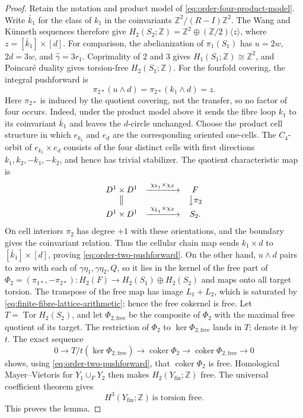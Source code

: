 \begin{proof}
Retain the notation and product model of
\eqref{eq:order-four-product-model}.
Write $\bar k_1$ for the class of $k_1$ in the coinvariants
$\mathbb Z^2/(R-I)\mathbb Z^2$.  The Wang and K\"unneth sequences
therefore give
$H_2(S_2;\mathbb Z)=\mathbb Z^2\oplus
(\mathbb Z/2)\langle z\rangle$, where
$z=[\bar k_1]\times[d]$.
For comparison, the abelianization of $\pi_1(S_1)$ has
$u=2w$, $2d=3w$, and $\widehat\gamma=3r_1$.  Coprimality of $2$ and $3$ gives
$H_1(S_1;\mathbb Z)\cong\mathbb Z^2$, and Poincar\'e duality gives
torsion-free $H_2(S_1;\mathbb Z)$.
For the fourfold covering, the integral pushforward is
\begin{equation}\label{eq:order-two-pushforward}
 \pi_{2*}(u\wedge d)
 =\pi_{2*}(k_1\wedge d)=z.
\end{equation}
Here $\pi_{2*}$ is induced by the quotient covering, not the transfer, so
no factor of four occurs.  Indeed, under the product model above it sends the
fibre loop $k_1$ to its coinvariant $\bar k_1$ and leaves the $d$-circle
unchanged.  Choose the product cell structure in which $e_{k_1}$ and
$e_d$ are the corresponding oriented one-cells.  The $C_4$-orbit of
$e_{k_1}\times e_d$ consists of the four distinct cells with first
directions $k_1,k_2,-k_1,-k_2$, and hence has trivial stabilizer.  The
quotient characteristic map is
\[
 \begin{array}{ccc}
 D^1\times D^1&
 \xrightarrow{\ \chi_{k_1}\times\chi_d\ }&F\\
 \big\Vert&&\big\downarrow{\pi_2}\\
 D^1\times D^1&
 \xrightarrow{\ \chi_{\bar k_1}\times\chi_d\ }&S_2 .
 \end{array}
\]
On cell interiors $\pi_2$ has degree $+1$ with these orientations, and
the boundary gives the coinvariant relation.  Thus the cellular chain map
sends $k_1\times d$ to $[\bar k_1]\times[d]$, proving
\eqref{eq:order-two-pushforward}.
On the other hand, $u\wedge d$ pairs to zero with each of
$\gamma\eta_1,\gamma\eta_2,Q$, so it lies in the kernel of the free part of
$\Phi_2=(\pi_{1*},-\pi_{2*}):H_2(F)\to H_2(S_1)\oplus H_2(S_2)$
and maps onto all target torsion.  The transpose of the free map has image
$L_1+L_2$, which is saturated by
\eqref{eq:finite-fibre-lattice-arithmetic}; hence the free cokernel is
free.  Let $T=\operatorname{Tor}H_2(S_2)$, and let
$\Phi_{2,\mathrm{free}}$ be the composite of $\Phi_2$ with the
maximal free quotient of its target.  The restriction of $\Phi_2$ to
$\ker\Phi_{2,\mathrm{free}}$ lands in $T$; denote it by $t$.  The
exact sequence
\[
 0\longrightarrow T/t(\ker\Phi_{2,\mathrm{free}})
 \longrightarrow\operatorname{coker}\Phi_2
 \longrightarrow\operatorname{coker}\Phi_{2,\mathrm{free}}
 \longrightarrow0
\]
shows, using \eqref{eq:order-two-pushforward}, that
$\operatorname{coker}\Phi_2$ is free.  Homological
Mayer--Vietoris for $Y_1\cup_F Y_2$ then makes
$H_2(Y_{\mathrm{fin}};\mathbb Z)$ free.  The universal coefficient theorem gives
\begin{equation}\label{eq:H3-B-torsion-free}
 H^3(Y_{\mathrm{fin}};\mathbb Z)\ \text{is torsion free}.
\end{equation}
This proves the lemma.\qedhere
\end{proof}

